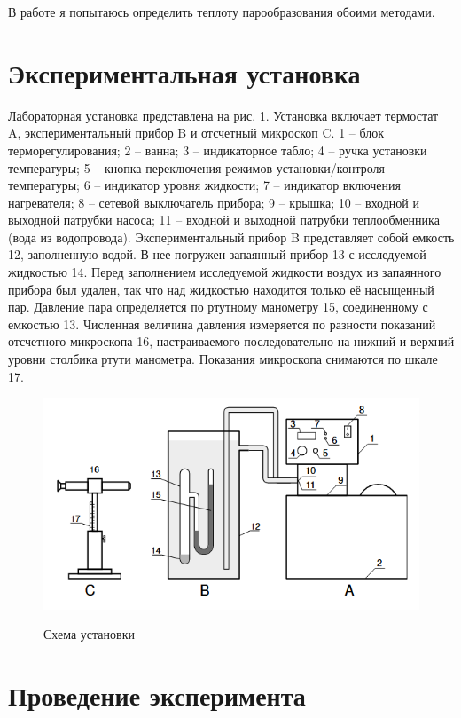 \documentclass[14pt, a4paper]{report}
\begin{document}
В работе я попытаюсь определить теплоту парообразования обоими методами.

\section{Экспериментальная установка}

Лабораторная установка представлена на рис. 1. Установка включает термостат A, экспериментальный прибор B и отсчетный микроскоп C. 1 -- блок терморегулирования; 2 -- ванна; 3 -- индикаторное табло; 4 -- ручка установки температуры; 5 -- кнопка переключения режимов установки/контроля температуры; 6 -- индикатор уровня жидкости; 7 -- индикатор включения нагревателя; 8 -- сетевой выключатель прибора; 9 -- крышка; 10 -- входной и выходной патрубки насоса; 11 -- входной и выходной патрубки теплообменника (вода из водопровода). Экспериментальный прибор B представляет собой емкость 12, заполненную водой. В нее погружен запаянный прибор 13 с исследуемой жидкостью 14. Перед заполнением исследуемой жидкости воздух из запаянного прибора был удален, так что над жидкостью находится только её насыщенный пар. Давление пара определяется по ртутному манометру 15, соединенному с емкостью 13. Численная величина давления измеряется по разности показаний отсчетного микроскопа 16, настраиваемого последовательно на нижний и верхний уровни столбика ртути манометра. Показания микроскопа снимаются по шкале 17.

\begin{figure}[!ht]
\centering
\includegraphics[scale=0.6]{terma_2_3.png}
\label{image3}
\caption{Схема установки}
\end{figure}

\section{Проведение эксперимента}
\end{document}
